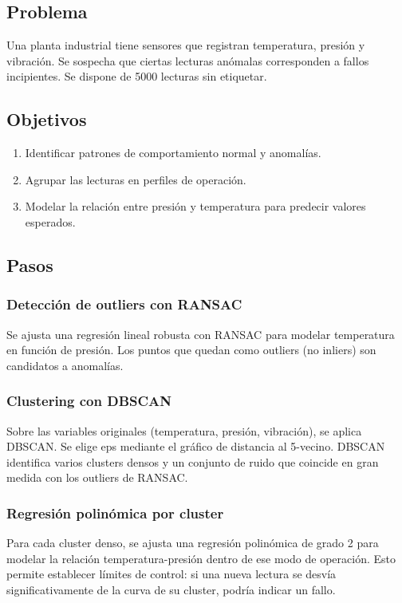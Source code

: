 \documentclass[12pt,a4paper,openany,oneside]{book}
\begin{document}
\subsection{Problema}
Una planta industrial tiene sensores que registran temperatura, presión y vibración. Se sospecha que ciertas lecturas anómalas corresponden a fallos incipientes. Se dispone de 5000 lecturas sin etiquetar.

\subsection{Objetivos}
\begin{enumerate}
    \item Identificar patrones de comportamiento normal y anomalías.
    \item Agrupar las lecturas en perfiles de operación.
    \item Modelar la relación entre presión y temperatura para predecir valores esperados.
\end{enumerate}

\subsection{Pasos}

\subsubsection{Detección de outliers con RANSAC}
Se ajusta una regresión lineal robusta con RANSAC para modelar temperatura en función de presión. Los puntos que quedan como outliers (no inliers) son candidatos a anomalías.

\subsubsection{Clustering con DBSCAN}
Sobre las variables originales (temperatura, presión, vibración), se aplica DBSCAN. Se elige eps mediante el gráfico de distancia al 5-vecino. DBSCAN identifica varios clusters densos y un conjunto de ruido que coincide en gran medida con los outliers de RANSAC.

\subsubsection{Regresión polinómica por cluster}
Para cada cluster denso, se ajusta una regresión polinómica de grado 2 para modelar la relación temperatura-presión dentro de ese modo de operación. Esto permite establecer límites de control: si una nueva lectura se desvía significativamente de la curva de su cluster, podría indicar un fallo.
\end{document}
